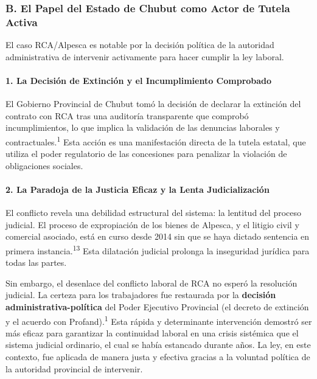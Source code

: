 \documentclass[]{article}
\begin{document}
\hypertarget{b.-el-papel-del-estado-de-chubut-como-actor-de-tutela-activa}{%
\subsubsection{B. El Papel del Estado de Chubut como Actor de Tutela
Activa}\label{b.-el-papel-del-estado-de-chubut-como-actor-de-tutela-activa}}

El caso RCA/Alpesca es notable por la decisión política de la autoridad
administrativa de intervenir activamente para hacer cumplir la ley
laboral.

\hypertarget{la-decisiuxf3n-de-extinciuxf3n-y-el-incumplimiento-comprobado}{%
\paragraph{1. La Decisión de Extinción y el Incumplimiento
Comprobado}\label{la-decisiuxf3n-de-extinciuxf3n-y-el-incumplimiento-comprobado}}

El Gobierno Provincial de Chubut tomó la decisión de declarar la
extinción del contrato con RCA tras una auditoría transparente que
comprobó incumplimientos, lo que implica la validación de las denuncias
laborales y contractuales.\textsuperscript{1} Esta acción es una
manifestación directa de la tutela estatal, que utiliza el poder
regulatorio de las concesiones para penalizar la violación de
obligaciones sociales.

\hypertarget{la-paradoja-de-la-justicia-eficaz-y-la-lenta-judicializaciuxf3n}{%
\paragraph{2. La Paradoja de la Justicia Eficaz y la Lenta
Judicialización}\label{la-paradoja-de-la-justicia-eficaz-y-la-lenta-judicializaciuxf3n}}

El conflicto revela una debilidad estructural del sistema: la lentitud
del proceso judicial. El proceso de expropiación de los bienes de
Alpesca, y el litigio civil y comercial asociado, está en curso desde
2014 sin que se haya dictado sentencia en primera
instancia.\textsuperscript{13} Esta dilatación judicial prolonga la
inseguridad jurídica para todas las partes.

Sin embargo, el desenlace del conflicto laboral de RCA no esperó la
resolución judicial. La certeza para los trabajadores fue restaurada por
la \textbf{decisión administrativa-política} del Poder Ejecutivo
Provincial (el decreto de extinción y el acuerdo con
Profand).\textsuperscript{1} Esta rápida y determinante intervención
demostró ser más eficaz para garantizar la continuidad laboral en una
crisis sistémica que el sistema judicial ordinario, el cual se había
estancado durante años. La ley, en este contexto, fue aplicada de manera
justa y efectiva gracias a la voluntad política de la autoridad
provincial de intervenir.
\end{document}
